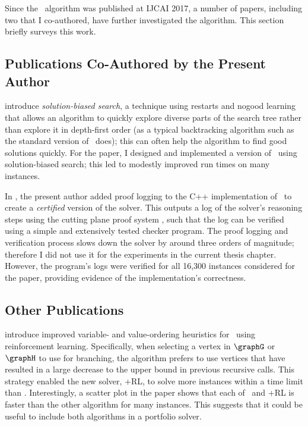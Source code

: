 Since the \McSplit\ algorithm was published at IJCAI 2017, a number of papers, including
two that I co-authored, have further investigated the algorithm.
This section briefly surveys this work.

\subsection{Publications Co-Authored by the Present Author}

\citet{DBLP:conf/cpaior/ArchibaldDHMP019} introduce \emph{solution-biased search},
a technique using restarts and nogood learning that allows an algorithm to quickly explore diverse
parts of the search tree rather than explore it in
depth-first order (as a typical backtracking algorithm
such as the standard version of \McSplit\ does); this can often help the algorithm to find good
solutions quickly.  For the paper, I designed and implemented a version
of \McSplit\ using solution-biased search; this led to modestly improved run times on many instances.

In \citet{DBLP:conf/cp/GochtMMNPT20}, the present
author added proof logging \citep{DBLP:conf/ijcai/GochtMN20} to the C++ implementation of
\McSplit\ to create a \emph{certified} version of the solver.  This outputs a log of the
solver's reasoning steps using the cutting plane proof system
\citep{DBLP:journals/dam/CookCT87}, such that the log can be verified using a
simple and extensively tested checker program.  The proof logging and verification process
slows down the solver by around three orders of magnitude; therefore I did not use it for
the experiments in the current thesis chapter.  However, the program's logs were verified
for all 16,300 instances considered for the paper, providing evidence of the implementation's
correctness.

\subsection{Other Publications}

\citet{DBLP:conf/aaai/0001LJ020} introduce improved variable- and value-ordering
heuristics for \McSplit\ using reinforcement learning.
Specifically, when selecting a vertex in $\graphG$ or $\graphH$ to use for branching,
the algorithm prefers to use vertices that have resulted in a large decrease to the upper bound
in previous recursive calls.  This strategy enabled the new solver, \McSplit+RL,
to solve more instances within a time limit than \McSplit. Interestingly, a scatter
plot in the paper shows that each of \McSplit\ and \McSplit+RL is faster than
the other algorithm for many instances. This suggests that it could be useful
to include both algorithms in a portfolio solver.


